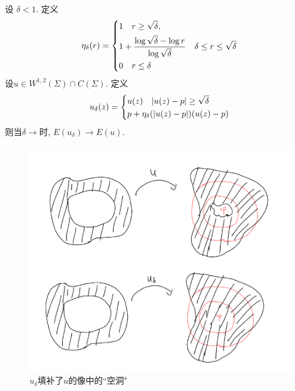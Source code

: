 \begin{lemma} \label{fill_hole}
    设 $\delta <1$. 定义
    \begin{equation}
        \eta_\delta(r)=\left\{
            \begin{aligned}
                &1 {\quad} r \ge \sqrt{\delta}, \\
                &1+\frac{\log \sqrt{\delta}- \log r}{ \log \sqrt{\delta}} {\quad} \delta \le r \le \sqrt{\delta}\\
                &0 {\quad} r \le \delta
            \end{aligned}
            \right.
    \end{equation}
    设$u \in W^{1,2}(\Sigma) \cap C(\Sigma)$. 定义
    \begin{equation}
        u_\delta(z)=\left\{
            \begin{aligned}
                & u(z) {\quad} {\left | u(z)-p \right |} \ge \sqrt{\delta} \\
                & p+ \eta_\delta({\left | u(z)-p \right |})(u(z)-p)
            \end{aligned}
        \right.
    \end{equation}
    则当$\delta \to $时, $E(u_\delta) \to E(u)$.
\end{lemma}
\begin{figure}[h]
    \centering
    \includegraphics[scale=0.5]{images/contraction.png}
    \caption{$u_\delta$填补了$u$的像中的``空洞"}
    \label{aaaanonlabel}
\end{figure}

